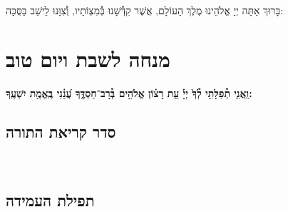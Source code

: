 \documentclass[twoside, openany, parskip=half, 11pt]{book}
\begin{document}
\begin{sometimes}

\\
בָּרוּךְ אַתָּה יְיָ אֱלֹהֵינוּ מֶלֶךְ הָעוֹלָם, אֲשֶׁר קִדְּ֯שָׁנוּ בְּ֯מִצְוֹתָיו, וְ֯צִוָּנוּ לֵישֵׁב בַּסֻּכָּה:
\end{sometimes}

%
\chapter[מנחה לשבת ויום טוב]{ מנחה לשבת ויום טוב }

\ashrei

\uvaletzion

\halfkaddish


\textbf{וַֽאֲנִ֤י תְ֯פִלָּתִ֥י לְ֯ךָ֙ יְיָ֡ עֵ֤ת רָצ֗וֹן אֱלֹהִ֥ים בְּ֯רָב־חַסְדֶּ֑ךָ עֲ֝נֵ֗נִי בֶּֽאֱמֶ֥ת יִשְׁעֶֽךָ:} 


\section*{ סדר קריאת התורה }


\pesicha

\gadlu

\avharachamim

\vesigale


\torahbarachu

\hagomel

\nextpage
\hagbaha

\galila

\yehalelu

\\
\kafdalet

\nextpage
\etzchaim


\halfkaddish


\section*{ תפילת העמידה }


\amidaopening{\shabbosshuva}{}
\end{document}
